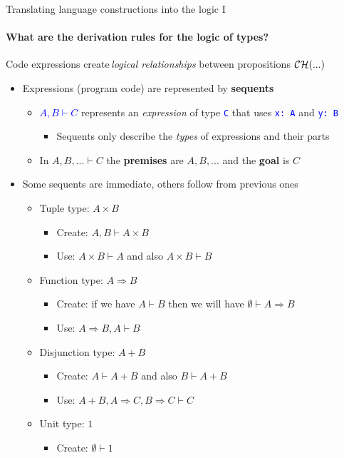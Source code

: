 \documentclass[english]{beamer}
\begin{document}
\begin{frame}{Translating language constructions into the logic I}


\framesubtitle{What are the derivation rules for the logic of types?}

Code expressions create\,\emph{logical relationships} between propositions
${\cal CH}(...)$
\begin{itemize}
\item Expressions (program code) are represented by \textbf{sequents}
\begin{itemize}
\item \textcolor{blue}{$A,B\vdash C$} represents an \emph{expression} of
type \texttt{\textcolor{blue}{\footnotesize{}C}} that uses \texttt{\textcolor{blue}{\footnotesize{}x:\ A}}
and \texttt{\textcolor{blue}{\footnotesize{}y:\ B}}{\footnotesize \par}
\begin{itemize}
\item Sequents only describe the \emph{types} of expressions and their parts
\end{itemize}
\item In $A,B,...\vdash C$ the \textbf{premises} are $A,B,...$ and the
\textbf{goal} is $C$
\end{itemize}
\item Some sequents are immediate, others follow from previous ones
\begin{itemize}
\item Tuple type: $A\times B$
\begin{itemize}
\item Create: $A,B\vdash A\times B$ 
\item Use: $A\times B\vdash A$ and also $A\times B\vdash B$
\end{itemize}
\item Function type: $A\Rightarrow B$
\begin{itemize}
\item Create: if we have $A\vdash B$ then we will have $\emptyset\vdash A\Rightarrow B$ 
\item Use: $A\Rightarrow B,A\vdash B$
\end{itemize}
\item Disjunction type: $A+B$
\begin{itemize}
\item Create: $A\vdash A+B$ and also $B\vdash A+B$
\item Use: $A+B,A\Rightarrow C,B\Rightarrow C\vdash C$
\end{itemize}
\item Unit type: $1$
\begin{itemize}
\item Create: $\emptyset\vdash1$
\end{itemize}
\end{itemize}
\end{itemize}
\end{frame}
\end{document}
